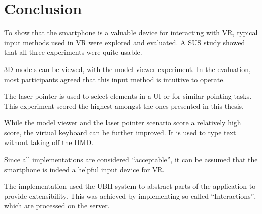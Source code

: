 \chapter{Conclusion}\label{chapter:conclusion}

To show that the smartphone is a valuable device for interacting with \gls{VR}, typical input methods used in \gls{VR} were explored and evaluated. A \gls{SUS} study showed that all three experiments were quite usable. 

\gls{3D} models can be viewed, with the model viewer experiment. In the evaluation, most participants agreed that this input method is intuitive to operate.

The laser pointer is used to select elements in a \gls{UI} or for similar pointing tasks. This experiment scored the highest amongst the ones presented in this thesis. 

While the model viewer and the laser pointer scenario score a relatively high score, the virtual keyboard can be further improved. It is used to type text without taking off the \gls{HMD}.

Since all implementations are considered \enquote{acceptable}, it can be assumed that the smartphone is indeed a helpful input device for \gls{VR}.

The implementation used the \gls{UBII} system to abstract parts of the application to provide extensibility. This was achieved by implementing so-called \enquote{Interactions}, which are processed on the server. 